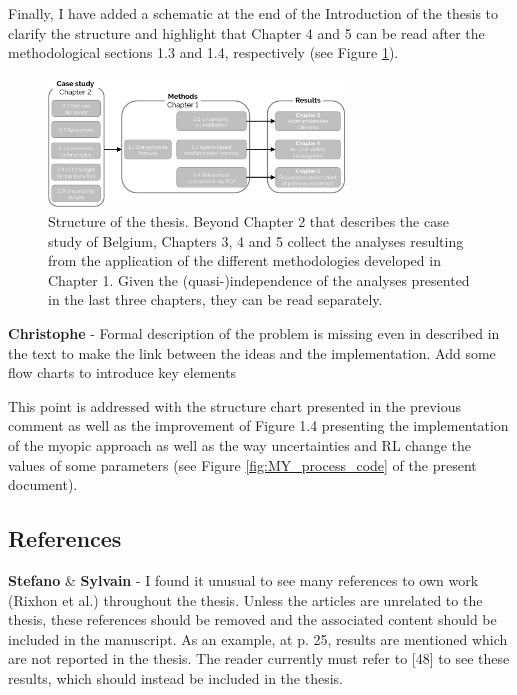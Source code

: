\documentclass[12pt,a4paper]{article}
\begin{document}
\noindent Finally, I have added a schematic at the end of the Introduction of the thesis to clarify the structure and highlight that Chapter 4 and 5 can be read after the methodological sections 1.3 and 1.4, respectively (see Figure \ref{fig:intro:Thesis_Structure}).

\begin{figure}[htbp!]
\centering
\includegraphics[width=0.7\textwidth]{Thesis_Structure.pdf}
\caption{Structure of the thesis. Beyond Chapter 2 that describes the case study of Belgium, Chapters 3, 4 and 5 collect the analyses resulting from the application of the different methodologies developed in Chapter 1. Given the (quasi-)independence of the analyses presented in the last three chapters, they can be read separately.}
\label{fig:intro:Thesis_Structure}
\end{figure}


\begin{mdframed}[style=comment] %
{\color{violet} \textbf{Christophe}} - Formal description of the problem is missing even in described in the text to make the link between the ideas and the implementation. Add some flow charts to introduce key elements
\end{mdframed}

\noindent This point is addressed with the structure chart presented in the previous comment as well as the improvement of Figure 1.4 presenting the implementation of the myopic approach as well as the way uncertainties and RL change the values of some parameters (see Figure \ref{fig:MY_process_code} of the present document).

\subsection{References}
\label{references}

\begin{mdframed}[style=comment] %
{\color{orange} \textbf{Stefano}} \& {\color{purple} \textbf{Sylvain}} - I found it unusual to see many references to own work (Rixhon et al.) throughout the thesis. Unless the articles are unrelated to the thesis, these references should be removed and the associated content should be included in the manuscript. As an example, at p. 25, results are mentioned which are not reported in the thesis. The reader currently must refer to [48] to see these results, which should instead be included in the thesis. 
\end{mdframed}
\end{document}
